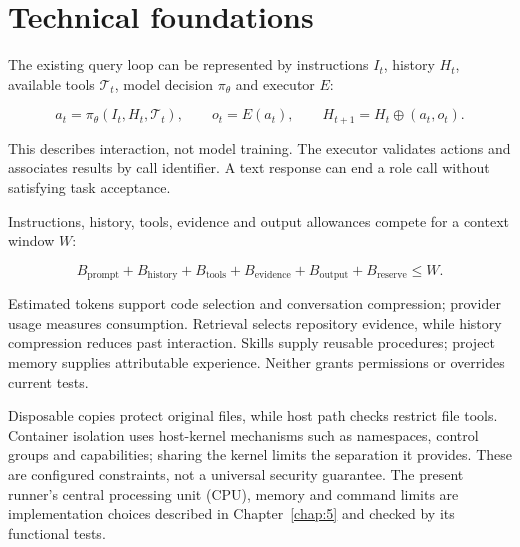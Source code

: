 \section{Technical foundations}\label{sec:2.6}

The existing query loop can be represented by instructions \(I_t\), history \(H_t\), available tools \(\mathcal{T}_t\), model decision \(\pi_\theta\) and executor \(E\):

\begin{equation}
a_t=\pi_\theta(I_t,H_t,\mathcal{T}_t),\qquad
o_t=E(a_t),\qquad
H_{t+1}=H_t\oplus(a_t,o_t).\label{eq:2-1}
\end{equation}

This describes interaction, not model training. The executor validates actions and associates results by call identifier. A text response can end a role call without satisfying task acceptance.

Instructions, history, tools, evidence and output allowances compete for a context window \(W\):

\begin{equation}
B_{\mathrm{prompt}}+B_{\mathrm{history}}+B_{\mathrm{tools}}
+B_{\mathrm{evidence}}+B_{\mathrm{output}}+B_{\mathrm{reserve}}\leq W.\label{eq:2-2}
\end{equation}

Estimated tokens support code selection and conversation compression; provider usage measures consumption. Retrieval selects repository evidence, while history compression reduces past interaction. Skills supply reusable procedures; project memory supplies attributable experience. Neither grants permissions or overrides current tests.

Disposable copies protect original files, while host path checks restrict file tools. Container isolation uses host-kernel mechanisms such as namespaces, control groups and capabilities; sharing the kernel limits the separation it provides. These are configured constraints, not a universal security guarantee. \citep{sultan2019containers} The present runner's central processing unit (CPU), memory and command limits are implementation choices described in Chapter~\ref{chap:5} and checked by its functional tests.
